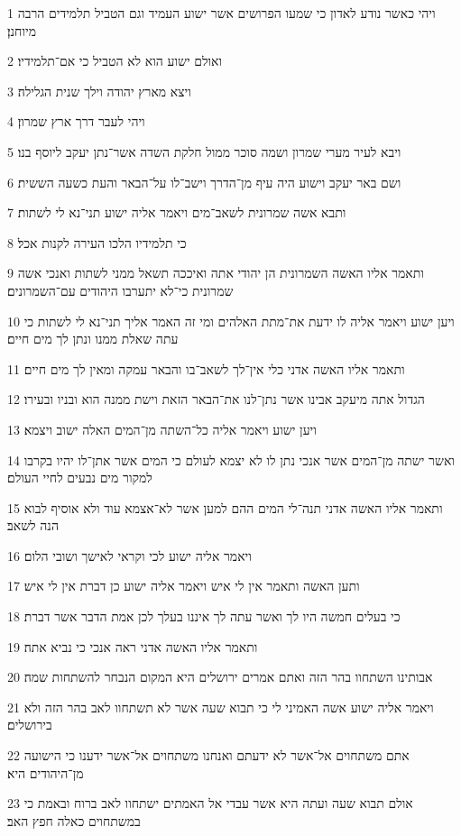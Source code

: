 \par 1 ויהי כאשר נודע לאדון כי שמעו הפרושים אשר ישוע העמיד וגם הטביל תלמידים הרבה מיוחנן׃
\par 2 ואולם ישוע הוא לא הטביל כי אם־תלמידיו׃
\par 3 ויצא מארץ יהודה וילך שנית הגלילה׃
\par 4 ויהי לעבר דרך ארץ שמרון׃
\par 5 ויבא לעיר מערי שמרון ושמה סוכר ממול חלקת השדה אשר־נתן יעקב ליוסף בנו׃
\par 6 ושם באר יעקב וישוע היה עיף מן־הדרך וישב־לו על־הבאר והעת כשעה הששית׃
\par 7 ותבא אשה שמרונית לשאב־מים ויאמר אליה ישוע תני־נא לי לשתות׃
\par 8 כי תלמידיו הלכו העירה לקנות אכל׃
\par 9 ותאמר אליו האשה השמרונית הן יהודי אתה ואיככה תשאל ממני לשתות ואנכי אשה שמרונית כי־לא יתערבו היהודים עם־השמרונים׃
\par 10 ויען ישוע ויאמר אליה לו ידעת את־מתת האלהים ומי זה האמר אליך תני־נא לי לשתות כי עתה שאלת ממנו ונתן לך מים חיים׃
\par 11 ותאמר אליו האשה אדני כלי אין־לך לשאב־בו והבאר עמקה ומאין לך מים חיים׃
\par 12 הגדול אתה מיעקב אבינו אשר נתן־לנו את־הבאר הזאת וישת ממנה הוא ובניו ובעירו׃
\par 13 ויען ישוע ויאמר אליה כל־השתה מן־המים האלה ישוב ויצמא׃
\par 14 ואשר ישתה מן־המים אשר אנכי נתן לו לא יצמא לעולם כי המים אשר אתן־לו יהיו בקרבו למקור מים נבעים לחיי העולם׃
\par 15 ותאמר אליו האשה אדני תנה־לי המים ההם למען אשר לא־אצמא עוד ולא אוסיף לבוא הנה לשאב׃
\par 16 ויאמר אליה ישוע לכי וקראי לאישך ושובי הלום׃
\par 17 ותען האשה ותאמר אין לי איש ויאמר אליה ישוע כן דברת אין לי איש׃
\par 18 כי בעלים חמשה היו לך ואשר עתה לך איננו בעלך לכן אמת הדבר אשר דברת׃
\par 19 ותאמר אליו האשה אדני ראה אנכי כי נביא אתה׃
\par 20 אבותינו השתחוו בהר הזה ואתם אמרים ירושלים היא המקום הנבחר להשתחות שמה׃
\par 21 ויאמר אליה ישוע אשה האמיני לי כי תבוא שעה אשר לא תשתחוו לאב בהר הזה ולא בירושלים׃
\par 22 אתם משתחוים אל־אשר לא ידעתם ואנחנו משתחוים אל־אשר ידענו כי הישועה מן־היהודים היא׃
\par 23 אולם תבוא שעה ועתה היא אשר עבדי אל האמתים ישתחוו לאב ברוח ובאמת כי במשתחוים כאלה חפץ האב׃
